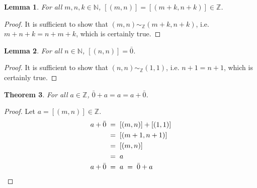 \documentclass[10pt]{article}
\newtheorem{theorem}{Theorem}[section]
\newtheorem{lemma}[theorem]{Lemma}
\theoremstyle{definition}
\theoremstyle{remark}
\newcommand{\N}{\mathbb{N}}
\newcommand{\Z}{\mathbb{Z}}
\newcommand{\simZ}{\sim_{\Z}}
\begin{document}
        \begin{lemma}
                For all $m, n, k \in \N$, $[(m, n)] = [(m + k, n + k)] \in \Z$.
        \end{lemma}
        \begin{proof}
                It is sufficient to show that $(m, n) \simZ (m + k, n + k)$, i.e.
                $m + n + k = n + m + k$, which is certainly true.
        \end{proof}
        \begin{lemma}
                For all $n \in \N$, $[(n, n)] = \bar{0}$.
        \end{lemma}
        \begin{proof}
                It is sufficient to show that $(n, n) \simZ (1, 1)$, i.e.
                $n + 1 = n + 1$, which is certainly true.
        \end{proof}

        \begin{theorem}
                For all $a \in \Z$, $\bar{0} + a = a = a + \bar{0}$.
        \end{theorem}
        \begin{proof}
                Let $a = [(m, n)] \in \Z$.
                \begin{align*}
                        a + \bar{0} \;&=\; [(m, n)] + [(1, 1)] \\
                                \;&=\; [(m + 1, n + 1)] \\
                                \;&=\; [(m, n)] \\
                                \;&=\; a \\
                        a + \bar{0} \;&=\; a \;=\; \bar{0} + a \qedhere
                \end{align*}
        \end{proof}
        
\end{document}
